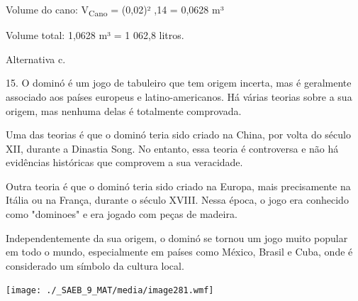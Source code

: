 \begin{escolha}
\begin{boxmedio}
\begin{boxmedio}
{\begin{boxpeq}
\begin{boxpeq}
{\begin{boxpeq}
\begin{boxmedio}
\begin{boxmedio}
\begin{boxpeq}
\begin{boxmedio}
\begin{boxpeq}
\begin{boxpeq}
\begin{boxpeq}
\begin{boxpeq}
\begin{boxmedio}
{\begin{boxmedio}
\begin{boxmedio}
\begin{boxpeq}
\begin{boxmedio}
\begin{boxpeq}
\begin{boxpeq}
\begin{boxpeq}
\begin{escolha}
{\begin{boxmedio}
\begin{boxpeq}
\begin{boxpeq}
\begin{boxpeq}
\begin{boxpeq}
\begin{boxpeq}
\begin{boxmedio}
\begin{boxpeq}
\begin{boxpeq}
\begin{boxpeq}
{\begin{boxpeq}
\begin{boxmedio}
\begin{boxpeq}
\begin{boxpeq}
\begin{boxpeq}
{\begin{boxpeq}
\begin{boxmedio}
{\begin{boxpeq}
\begin{boxpeq}
\begin{boxmedio}
\begin{boxmedio}
\begin{boxpeq}
\begin{boxpeq}
{\begin{boxpeq}
\begin{boxpeq}
\begin{boxpeq}
\begin{boxpeq}
\begin{boxpeq}
\begin{escolha}
\begin{escolha}
{\begin{boxmedio}
\begin{boxpeq}
\begin{q°}
\begin{boxmedio}
\begin{boxpeq}
\begin{boxpeq}
\begin{boxmedio}
\begin{boxmedio}
\begin{boxmedio}
\begin{boxmedio}
{\begin{escolha}
\begin{escolha}
\begin{escolha}
\begin{escolha}
\begin{escolha}
\begin{escolha}
{Volume do cano: V\textsubscript{Cano} = (0,02)² ,14  = 0,0628 m³

Volume total: 1,0628 m³ = 1 062,8 litros.

Alternativa c.

15. O dominó é um jogo de tabuleiro que tem origem incerta, mas é
geralmente associado aos países europeus e latino-americanos. Há várias
teorias sobre a sua origem, mas nenhuma delas é totalmente comprovada.

Uma das teorias é que o dominó teria sido criado na China, por volta do
século XII, durante a Dinastia Song. No entanto, essa teoria é
controversa e não há evidências históricas que comprovem a sua
veracidade.

Outra teoria é que o dominó teria sido criado na Europa, mais
precisamente na Itália ou na França, durante o século XVIII. Nessa
época, o jogo era conhecido como "dominoes" e era jogado com peças de
madeira.

Independentemente da sua origem, o dominó se tornou um jogo muito
popular em todo o mundo, especialmente em países como México, Brasil e
Cuba, onde é considerado um símbolo da cultura local.

\texttt{[image: ./\_SAEB\_9\_MAT/media/image281.wmf]}

}
\end{escolha}
\end{escolha}
\end{escolha}
\end{escolha}
\end{escolha}
\end{escolha}}
\end{boxmedio}
\end{boxmedio}
\end{boxmedio}
\end{boxmedio}
\end{boxpeq}
\end{boxpeq}
\end{boxmedio}
\end{q°}
\end{boxpeq}
\end{boxmedio}}
\end{escolha}
\end{escolha}
\end{boxpeq}
\end{boxpeq}
\end{boxpeq}
\end{boxpeq}
\end{boxpeq}}
\end{boxpeq}
\end{boxpeq}
\end{boxmedio}
\end{boxmedio}
\end{boxpeq}
\end{boxpeq}}
\end{boxmedio}
\end{boxpeq}}
\end{boxpeq}
\end{boxpeq}
\end{boxpeq}
\end{boxmedio}
\end{boxpeq}}
\end{boxpeq}
\end{boxpeq}
\end{boxpeq}
\end{boxmedio}
\end{boxpeq}
\end{boxpeq}
\end{boxpeq}
\end{boxpeq}
\end{boxpeq}
\end{boxmedio}}
\end{escolha}
\end{boxpeq}
\end{boxpeq}
\end{boxpeq}
\end{boxmedio}
\end{boxpeq}
\end{boxmedio}
\end{boxmedio}}
\end{boxmedio}
\end{boxpeq}
\end{boxpeq}
\end{boxpeq}
\end{boxpeq}
\end{boxmedio}
\end{boxpeq}
\end{boxmedio}
\end{boxmedio}
\end{boxpeq}}
\end{boxpeq}
\end{boxpeq}}
\end{boxmedio}
\end{boxmedio}
\end{escolha}
